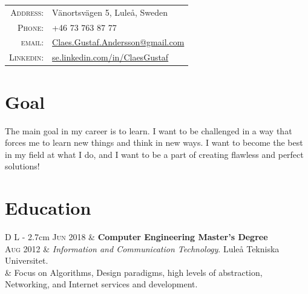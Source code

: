 \documentclass[a4paper,10pt]{article}
\begin{document}
\begin{tabular}{Dl}
    \textsc{Address:}	&	 Vänortsvägen 5, Luleå, Sweden \\
    \textsc{Phone:}		&	 +46 73 763 87 77\\
    \textsc{email:}		&	 \href{mailto:Claes.Gustaf.Andersson@gmail.com}{Claes.Gustaf.Andersson@gmail.com}\\
    \textsc{Linkedin:}		&	 \url{se.linkedin.com/in/ClaesGustaf}
\end{tabular}

\section{Goal}
{\small The main goal in my career is to learn. I want to be challenged in a way that forces me to learn new things and think in new ways. I want to become the best in my field at what I do, and I want to be a part of creating flawless and perfect solutions!}

\section{Education}
\begin{tabular}{D L {\textwidth - 2.7cm}}
\textsc{Jun 2018}	&	\textbf{Computer Engineering Master's Degree}\\
\textsc{Aug 2012}	&	 \emph{Information and Communication Technology}. Luleå Tekniska Universitet.\\
			&	{\small Focus on Algorithms, Design paradigms, high levels of abstraction, Networking, and Internet services and development.}
\end{tabular}


\end{document}
